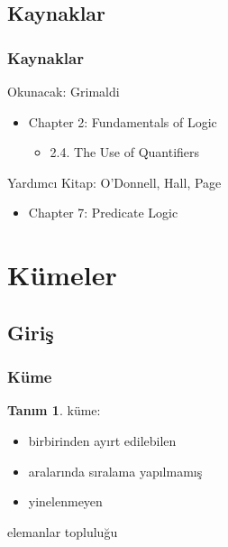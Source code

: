\documentclass[dvipsnames]{beamer}
\theoremstyle{definition}
\newtheorem{tanim}[theorem]{Tanım}
\theoremstyle{example}
\theoremstyle{plain}
\begin{document}
\subsection*{Kaynaklar}

\begin{frame}
  \frametitle{Kaynaklar}

  \begin{block}{Okunacak: Grimaldi}
    \begin{itemize}
      \item Chapter 2: Fundamentals of Logic
      \begin{itemize}
        \item 2.4. \alert{The Use of Quantifiers}
      \end{itemize}
    \end{itemize}
  \end{block}

  \begin{block}{Yardımcı Kitap: O'Donnell, Hall, Page}
    \begin{itemize}
      \item Chapter 7: Predicate Logic
    \end{itemize}
  \end{block}
\end{frame}

\section{Kümeler}

\subsection{Giriş}

\begin{frame}
  \frametitle{Küme}

  \begin{tanim}
    \alert{küme}:

    \begin{itemize}
      \item birbirinden ayırt edilebilen
      \item aralarında sıralama yapılmamış
      \item yinelenmeyen
    \end{itemize}

    elemanlar topluluğu
  \end{tanim}
\end{frame}
\end{document}
